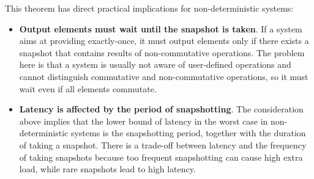 This theorem has direct practical implications for non-deterministic systems:
\begin{itemize}
    \item {\bf Output elements must wait until the snapshot is taken}. If a system aims at providing exactly-once, it must output elements only if there exists a snapshot that contains results of non-commutative operations. The problem here is that a system is usually not aware of user-defined operations and cannot distinguish commutative and non-commutative operations, so it must wait even if all elements commutate.
    \item {\bf Latency is affected by the period of snapshotting}. The consideration above implies that the lower bound of latency in the worst case in non-deterministic systems is the snapshotting period, together with the duration of taking a snapshot. There is a trade-off between latency and the frequency of taking snapshots because too frequent snapshotting can cause high extra load, while rare snapshots lead to high latency.
\end{itemize}
